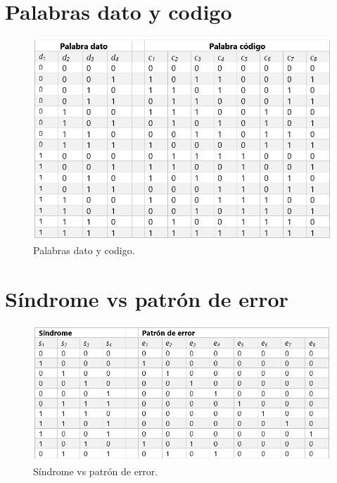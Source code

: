 \documentclass[12pt,letterpaper]{article}
\begin{document}
\newpage
\section{Palabras dato y codigo}
\begin{figure}[ht]
    \centering
    \includegraphics[width=1\textwidth]{pc.png}
    \caption{Palabras dato y codigo.}
\end{figure}

\newpage
\section{Síndrome vs patrón de error}
\begin{figure}[ht]
    \centering
    \includegraphics[width=1\textwidth]{sp.png}
    \caption{Síndrome vs patrón de error.}
\end{figure}

\newpage
\end{document}
